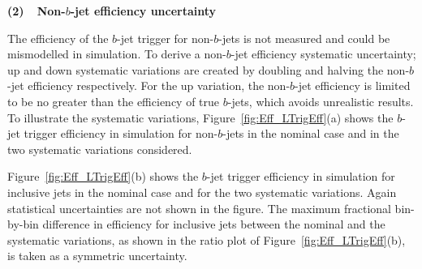 \noindent
\textbf{(2)~~Non-$b$-jet efficiency uncertainty}
\label{sec:trig-lightTrigEff}

The efficiency of the $b$-jet trigger for non-$b$-jets is not measured and could be mismodelled in simulation.
To derive a non-$b$-jet efficiency systematic uncertainty; up and down systematic variations are created by doubling and halving the non-$b$-jet efficiency respectively.
For the up variation, the non-$b$-jet efficiency is limited to be no greater than the efficiency of true $b$-jets, which avoids unrealistic results.
To illustrate the systematic variations,
Figure~\ref{fig:Eff_LTrigEff}(a) shows the $b$-jet trigger efficiency in simulation for non-$b$-jets in the nominal case and in the two systematic variations considered.

Figure~\ref{fig:Eff_LTrigEff}(b) shows the $b$-jet trigger efficiency in simulation for inclusive jets in the nominal case and for the two systematic variations.
Again statistical uncertainties are not shown in the figure. %
The maximum fractional bin-by-bin difference in efficiency for inclusive jets between the nominal and the systematic variations,
as shown in the ratio plot of Figure~\ref{fig:Eff_LTrigEff}(b),
is taken as a symmetric uncertainty.

